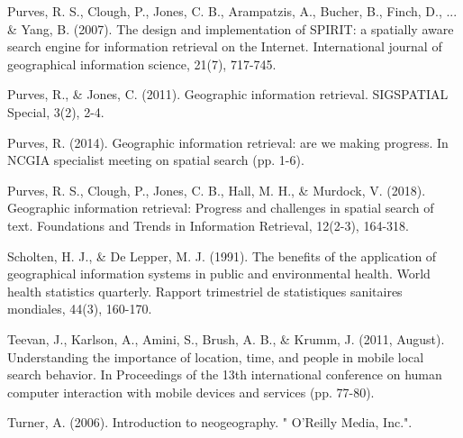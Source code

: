 \documentclass{llncs}
\begin{document}
\begin{thebibliography}{}
Purves, R. S., Clough, P., Jones, C. B., Arampatzis, A., Bucher, B.,
Finch, D., ... \& Yang, B. (2007). The design and implementation of SPIRIT: a
spatially aware search engine for information retrieval on the Internet.
International journal of geographical information science, 21(7), 717-745.

Purves, R., \& Jones, C. (2011). Geographic information retrieval. SIGSPATIAL
Special, 3(2), 2-4.

Purves, R. (2014). Geographic information retrieval: are we making progress. In
NCGIA specialist meeting on spatial search (pp. 1-6).

Purves, R. S., Clough, P., Jones, C. B., Hall, M. H., \& Murdock, V. (2018).
Geographic information retrieval: Progress and challenges in spatial search of
text. Foundations and Trends in Information Retrieval, 12(2-3), 164-318.

Scholten, H. J., \& De Lepper, M. J. (1991). The benefits of the application of
geographical information systems in public and environmental health. World
health statistics quarterly. Rapport trimestriel de statistiques sanitaires
mondiales, 44(3), 160-170.

Teevan, J., Karlson, A., Amini, S., Brush, A. B., \& Krumm, J. (2011, August).
Understanding the importance of location, time, and people in mobile local
search behavior. In Proceedings of the 13th international conference on human
computer interaction with mobile devices and services (pp. 77-80).

Turner, A. (2006). Introduction to neogeography. " O'Reilly Media, Inc.".

\end{thebibliography}

\clearpage
{} %
\renewcommand{\indexname}{Índice de temas}

\end{document}
